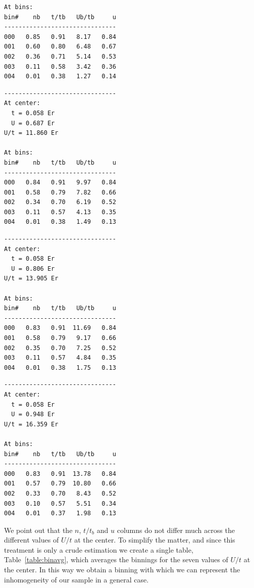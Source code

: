 \documentclass[11pt,letter]{article}
\begin{document}
\begin{table}
{\begin{minipage}[b][10em][b]{0.33\textwidth}
\begin{verbatim}
At bins:
bin#    nb   t/tb   Ub/tb     u     
-------------------------------
000   0.85   0.91   8.17   0.84
001   0.60   0.80   6.48   0.67
002   0.36   0.71   5.14   0.53
003   0.11   0.58   3.42   0.36
004   0.01   0.38   1.27   0.14
\end{verbatim}
\end{minipage}
\begin{minipage}[b][10em][b]{0.33\textwidth}
\begin{verbatim}
-------------------------------
At center:
  t = 0.058 Er
  U = 0.687 Er
U/t = 11.860 Er

At bins:
bin#    nb   t/tb   Ub/tb     u     
-------------------------------
000   0.84   0.91   9.97   0.84
001   0.58   0.79   7.82   0.66
002   0.34   0.70   6.19   0.52
003   0.11   0.57   4.13   0.35
004   0.01   0.38   1.49   0.13
\end{verbatim}
\end{minipage}
\begin{minipage}[b][10em][b]{0.33\textwidth}
\begin{verbatim}
-------------------------------
At center:
  t = 0.058 Er
  U = 0.806 Er
U/t = 13.905 Er

At bins:
bin#    nb   t/tb   Ub/tb     u     
-------------------------------
000   0.83   0.91  11.69   0.84
001   0.58   0.79   9.17   0.66
002   0.35   0.70   7.25   0.52
003   0.11   0.57   4.84   0.35
004   0.01   0.38   1.75   0.13
\end{verbatim}
\end{minipage}

\vspace{8em}

\begin{minipage}[b][10em][b]{0.33\textwidth}
\begin{verbatim}
-------------------------------
At center:
  t = 0.058 Er
  U = 0.948 Er
U/t = 16.359 Er

At bins:
bin#    nb   t/tb   Ub/tb     u     
-------------------------------
000   0.83   0.91  13.78   0.84
001   0.57   0.79  10.80   0.66
002   0.33   0.70   8.43   0.52
003   0.10   0.57   5.51   0.34
004   0.01   0.37   1.98   0.13
\end{verbatim}
\end{minipage}
}
\caption[Binning for various values of $U/t$]{Binning for various values of $U/t$}
\label{table:binall} 
\end{table}

We point out that the $n$, $t/t_{b}$ and $u$ columns do not differ much across
the different values of $U/t$ at the center.   To simplify the matter, and
since this treatment is only a crude estimation we create a single table,
Table~\ref{table:binavg}, which averages the binnings for the seven values of
$U/t$ at the center.   In this way we obtain a binning with which we can
represent the inhomogeneity of our sample in a general case.  
\end{document}
